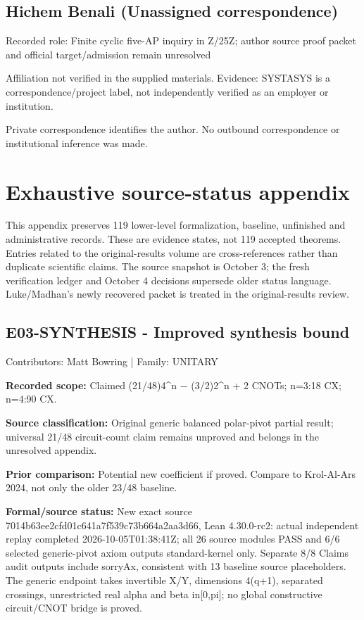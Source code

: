 \documentclass[11pt,a4paper]{article}
\begin{document}
\subsection{Hichem Benali (Unassigned correspondence)}
Recorded role: Finite cyclic five-AP inquiry in Z/25Z; author source proof packet and official target/admission remain unresolved

Affiliation not verified in the supplied materials. Evidence: SYSTASYS is a correspondence/project label, not independently verified as an employer or institution.

Private correspondence identifies the author. No outbound correspondence or institutional inference was made.

\clearpage
\section{Exhaustive source-status appendix}
This appendix preserves 119 lower-level formalization, baseline, unfinished and administrative records. These are evidence states, not 119 accepted theorems. Entries related to the original-results volume are cross-references rather than duplicate scientific claims. The source snapshot is October 3; the fresh verification ledger and October 4 decisions supersede older status language. Luke/Madhan's newly recovered packet is treated in the original-results review.

\begin{samepage}
\subsection{E03-SYNTHESIS  -  Improved synthesis bound}
{\small Contributors: Matt Bowring | Family: UNITARY\par}

\textbf{Recorded scope:} Claimed (21/48)4\textasciicircum{}n \ensuremath{-} (3/2)2\textasciicircum{}n + 2 CNOTs; n=3:18 CX; n=4:90 CX.

\end{samepage}
\textbf{Source classification:} Original generic balanced polar-pivot partial result; universal 21/48 circuit-count claim remains unproved and belongs in the unresolved appendix.

\textbf{Prior comparison:} Potential new coefficient if proved. Compare to Krol-Al-Ars 2024, not only the older 23/48 baseline.

\textbf{Formal/source status:} New exact source 7014b63ee2cfd01c641a7f539c73b664a2aa3d66, Lean 4.30.0-rc2: actual independent replay completed 2026-10-05T01:38:41Z; all 26 source modules PASS and 6/6 selected generic-pivot axiom outputs standard-kernel only. Separate 8/8 Claims audit outputs include sorryAx, consistent with 13 baseline source placeholders. The generic endpoint takes invertible X/Y, dimensions 4(q+1), separated crossings, unrestricted real alpha and beta in[0,pi]; no global constructive circuit/CNOT bridge is proved.
\end{document}
